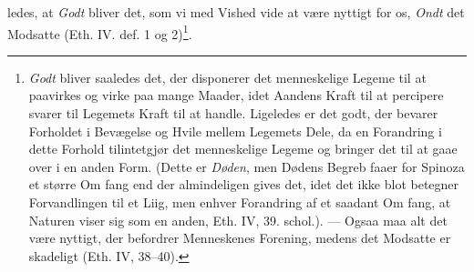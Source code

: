 \documentclass[12pt,a4paper]{book}
\begin{document}
ledes, at \emph{Godt} bliver det, som vi med Vished vide at være
nyttigt for os, \emph{Ondt} det Modsatte (Eth. IV. def. 1 og 2)\footnote{%
\emph{Godt} bliver saaledes det, der disponerer det menneskelige Legeme
til at paavirkes og virke paa mange Maader, idet Aandens Kraft til
at percipere svarer til Legemets Kraft til at handle. Ligeledes er
det godt, der bevarer Forholdet i Bevægelse og Hvile mellem Legemets
Dele, da en Forandring i dette Forhold tilintetgjør det menneskelige
Legeme og bringer det til at gaae over i en anden Form. (Dette
er \emph{Døden}, men Dødens Begreb faaer for Spinoza et større Om\-%
fang end der almindeligen gives det, idet det ikke blot betegner
Forvandlingen til et Liig, men enhver Forandring af et saadant Om\-%
fang, at Naturen viser sig som en anden, Eth. IV, 39. schol.). --- Ogsaa maa alt det være nyttigt, der befordrer Menneskenes Forening,
medens det Modsatte er skadeligt (Eth. IV, 38--40).}.
\end{document}
